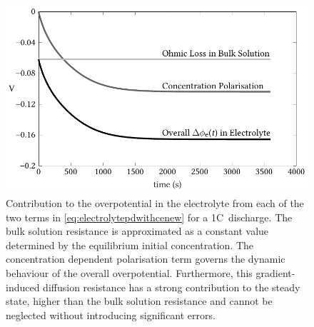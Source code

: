 \begin{figure}[!htbp]
    \centering
    \includegraphics{chapters/sys_id/figures/contribution_to_phie_1C.pdf}
    \caption[%
    Contribution to electrolyte overpotential from the gradient-induced polarisation
    term and the bulk solution resistance term for a 1C~discharge
    ]%
    {%
        Contribution to the overpotential in the electrolyte from each of the
        two terms in \cref{eq:electrolytepdwithcenew} for a 1C~discharge. The
        bulk solution resistance is approximated as a constant value determined
        by the equilibrium initial concentration. The concentration dependent
        polarisation term governs the dynamic behaviour of the overall
        overpotential. Furthermore, this gradient-induced diffusion resistance
        has a strong contribution to the steady state, higher than the bulk
        solution resistance and cannot be neglected without introducing
        significant errors.
}%
\label{fig:contributiontophiefromtwoterms}
\end{figure}

